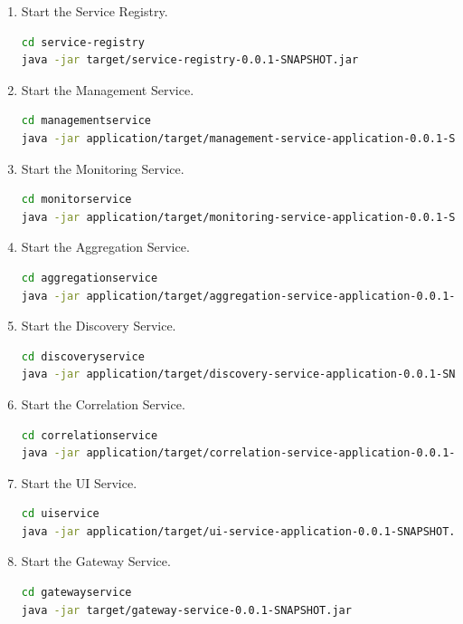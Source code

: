 \begin{enumerate}

	\item Start the Service Registry.
\begin{lstlisting}[language=bash]
cd service-registry
java -jar target/service-registry-0.0.1-SNAPSHOT.jar  
\end{lstlisting}	

	\item Start the Management Service.
\begin{lstlisting}[language=bash]
cd managementservice
java -jar application/target/management-service-application-0.0.1-SNAPSHOT.jar 
\end{lstlisting}	

	\item Start the Monitoring Service.
\begin{lstlisting}[language=bash]
cd monitorservice
java -jar application/target/monitoring-service-application-0.0.1-SNAPSHOT.jar
\end{lstlisting}	

	\item Start the Aggregation Service.
\begin{lstlisting}[language=bash]
cd aggregationservice
java -jar application/target/aggregation-service-application-0.0.1-SNAPSHOT.jar
\end{lstlisting}	

	\item Start the Discovery Service.
\begin{lstlisting}[language=bash]
cd discoveryservice
java -jar application/target/discovery-service-application-0.0.1-SNAPSHOT.jar
\end{lstlisting}	

	\item Start the Correlation Service.
\begin{lstlisting}[language=bash]
cd correlationservice
java -jar application/target/correlation-service-application-0.0.1-SNAPSHOT.jar
\end{lstlisting}	

	\item Start the UI Service.
\begin{lstlisting}[language=bash]
cd uiservice
java -jar application/target/ui-service-application-0.0.1-SNAPSHOT.jar
\end{lstlisting}	

	\item Start the Gateway Service.
\begin{lstlisting}[language=bash]
cd gatewayservice
java -jar target/gateway-service-0.0.1-SNAPSHOT.jar
\end{lstlisting}	

\end{enumerate}

